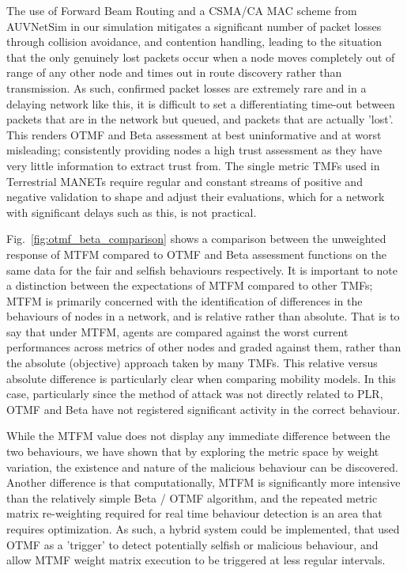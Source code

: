 \documentclass[conference]{IEEEtran}
\begin{document}
%
The use of Forward Beam Routing and a CSMA/CA MAC scheme from AUVNetSim\cite{Miquel2008} in our simulation mitigates a significant number of packet losses through collision avoidance, and contention handling, leading to the situation that the only genuinely lost packets occur when a node moves completely out of range of any other node and times out in route discovery rather than transmission.
As such, confirmed packet losses are extremely rare and in a delaying network like this, it is difficult to set a differentiating time-out between packets that are in the network but queued, and packets that are actually 'lost'.
This renders OTMF and Beta assessment at best uninformative and at worst misleading; consistently providing nodes a high trust assessment as they have very little information to extract trust from. 
The single metric TMFs used in Terrestrial MANETs require regular and constant streams of positive and negative validation to shape and adjust their evaluations, which for a network with significant delays such as this, is not practical.

Fig.~\ref{fig:otmf_beta_comparison} shows a comparison between the unweighted response of MTFM compared to OTMF and Beta assessment functions on the same data for the fair and selfish behaviours respectively.
It is important to note a distinction between the expectations of MTFM compared to other TMFs; MTFM is primarily concerned with the identification of differences in the behaviours of nodes in a network, and is relative rather than absolute.
That is to say that under MTFM, agents are compared against the worst current performances across metrics of other nodes and graded against them, rather than the absolute (objective) approach taken by many TMFs.
This relative versus absolute difference is particularly clear when comparing mobility models. 
In this case, particularly since the method of attack was not directly related to PLR, OTMF and Beta have not registered significant activity in the correct behaviour.

While the MTFM value does not display any immediate difference between the two behaviours, we have shown that by exploring the metric space by weight variation, the existence and nature of the malicious behaviour can be discovered.
Another difference is that computationally, MTFM is significantly more intensive than the relatively simple Beta / OTMF algorithm, and the repeated metric matrix re-weighting required for real time behaviour detection is an area that requires optimization. 
As such, a hybrid system could be implemented, that used OTMF as a 'trigger' to detect potentially selfish or malicious behaviour, and allow MTMF weight matrix execution to be triggered at less regular intervals.
\end{document}
